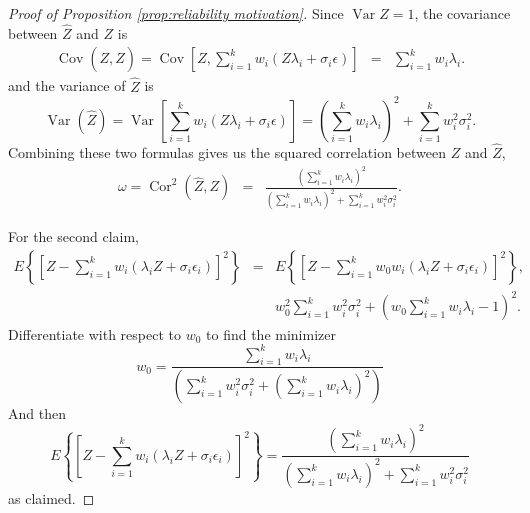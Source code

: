 \documentclass[twoside]{article}
\DeclareMathOperator{\Var}{Var}
\DeclareMathOperator{\Cor}{Cor}
\DeclareMathOperator{\Cov}{Cov}
\begin{document}
\begin{proof}[Proof of Proposition \ref{prop:reliability motivation}]\label{proof:reliability motivation}
Since $\Var Z=1$, the covariance between $\hat{Z}$ and $Z$
is
\begin{eqnarray*}
\Cov\left(Z,\hat{Z}\right)=\Cov\left[Z,\sum_{i=1}^{k}w_{i}\left(Z\lambda_{i}+\sigma_{i}\epsilon\right)\right] & = & \sum_{i=1}^{k}w_{i}\lambda_{i}.
\end{eqnarray*}
and the variance of $\hat{Z}$ is
\[
\Var\left(\hat{Z}\right)=\Var\left[\sum_{i=1}^{k}w_{i}\left(Z\lambda_{i}+\sigma_{i}\epsilon\right)\right]=\left(\sum_{i=1}^{k}w_{i}\lambda_{i}\right)^{2}+\sum_{i=1}^{k}w_{i}^{2}\sigma_{i}^{2}.
\]
Combining these two formulas gives us the squared correlation between
$Z$ and $\hat{Z}$,
\begin{eqnarray*}
\omega=\Cor^{2}\left(\hat{Z},Z\right) & = & \frac{\left(\sum_{i=1}^{k}w_{i}\lambda_{i}\right)^{2}}{\left(\sum_{i=1}^{k}w_{i}\lambda_{i}\right)^{2}+\sum_{i=1}^{k}w_{i}^{2}\sigma_{i}^{2}}.
\end{eqnarray*}

For the second claim,
\begin{eqnarray*}
E\left\{ \left[Z-\sum_{i=1}^{k}w_{i}\left(\lambda_{i}Z+\sigma_{i}\epsilon_{i}\right)\right]^{2}\right\}  & = & E\left\{ \left[Z-\sum_{i=1}^{k}w_{0}w_{i}\left(\lambda_{i}Z+\sigma_{i}\epsilon_{i}\right)\right]^{2}\right\} ,\\
 &  & w_{0}^{2}\sum_{i=1}^{k}w_{i}^{2}\sigma_{i}^{2}+\left(w_{0}\sum_{i=1}^{k}w_{i}\lambda_{i}-1\right)^{2}.
\end{eqnarray*}
Differentiate with respect to $w_{0}$ to find the minimizer
\[
w_{0}=\frac{\sum_{i=1}^{k}w_{i}\lambda_{i}}{\left(\sum_{i=1}^{k}w_{i}^{2}\sigma_{i}^{2}+\left(\sum_{i=1}^{k}w_{i}\lambda_{i}\right)^{2}\right)}
\]
And then
\[
E\left\{ \left[Z-\sum_{i=1}^{k}w_{i}\left(\lambda_{i}Z+\sigma_{i}\epsilon_{i}\right)\right]^{2}\right\} =\frac{\left(\sum_{i=1}^{k}w_{i}\lambda_{i}\right)^{2}}{\left(\sum_{i=1}^{k}w_{i}\lambda_{i}\right)^{2}+\sum_{i=1}^{k}w_{i}^{2}\sigma_{i}^{2}}
\]
as claimed.
\end{proof}
\end{document}
